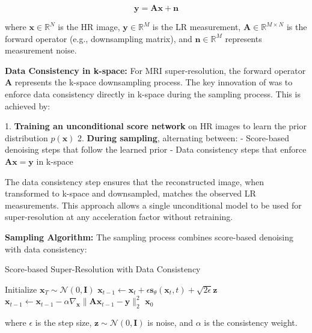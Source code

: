 \documentclass{midl} %
\begin{document}
\begin{equation}
\mathbf{y} = \mathbf{A}\mathbf{x} + \mathbf{n}
\end{equation}

where $\mathbf{x} \in \mathbb{R}^N$ is the HR image, $\mathbf{y} \in \mathbb{R}^M$ is the LR measurement, $\mathbf{A} \in \mathbb{R}^{M \times N}$ is the forward operator (e.g., downsampling matrix), and $\mathbf{n} \in \mathbb{R}^M$ represents measurement noise.

\textbf{Data Consistency in k-space:} For MRI super-resolution, the forward operator $\mathbf{A}$ represents the k-space downsampling process. The key innovation of \citet{song2021solving} was to enforce data consistency directly in k-space during the sampling process. This is achieved by:

1. \textbf{Training an unconditional score network} on HR images to learn the prior distribution $p(\mathbf{x})$
2. \textbf{During sampling}, alternating between:
   - Score-based denoising steps that follow the learned prior
   - Data consistency steps that enforce $\mathbf{A}\mathbf{x} = \mathbf{y}$ in k-space

The data consistency step ensures that the reconstructed image, when transformed to k-space and downsampled, matches the observed LR measurements. This approach allows a single unconditional model to be used for super-resolution at any acceleration factor without retraining.

\textbf{Sampling Algorithm:} The sampling process combines score-based denoising with data consistency:

\begin{algorithm}
\caption{Score-based Super-Resolution with Data Consistency}
\begin{algorithmic}[1]
\State Initialize $\mathbf{x}_T \sim \mathcal{N}(0, \mathbf{I})$
    \State $\mathbf{x}_{t-1} \leftarrow \mathbf{x}_t + \epsilon \mathbf{s}_\theta(\mathbf{x}_t, t) + \sqrt{2\epsilon} \mathbf{z}$ 
    \State $\mathbf{x}_{t-1} \leftarrow \mathbf{x}_{t-1} - \alpha \nabla_{\mathbf{x}} \|\mathbf{A}\mathbf{x}_{t-1} - \mathbf{y}\|_2^2$ 
\EndFor
\State \Return $\mathbf{x}_0$
\end{algorithmic}
\end{algorithm}

where $\epsilon$ is the step size, $\mathbf{z} \sim \mathcal{N}(0, \mathbf{I})$ is noise, and $\alpha$ is the consistency weight.
\end{document}
